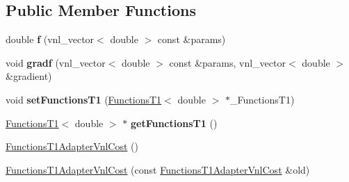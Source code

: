 \subsection*{Public Member Functions}
\begin{DoxyCompactItemize}
\item 
\hypertarget{class_ox_1_1_functions_t1_adapter_vnl_cost_ae74d956d16b010a32cfabda090674d4b}{double {\bfseries f} (vnl\-\_\-vector$<$ double $>$ const \&params)}\label{class_ox_1_1_functions_t1_adapter_vnl_cost_ae74d956d16b010a32cfabda090674d4b}

\item 
\hypertarget{class_ox_1_1_functions_t1_adapter_vnl_cost_a6a147aabdfb2c40916fe353044739484}{void {\bfseries gradf} (vnl\-\_\-vector$<$ double $>$ const \&params, vnl\-\_\-vector$<$ double $>$ \&gradient)}\label{class_ox_1_1_functions_t1_adapter_vnl_cost_a6a147aabdfb2c40916fe353044739484}

\item 
\hypertarget{class_ox_1_1_functions_t1_adapter_vnl_cost_a42a684f88c04d8b1bfafeb010a27a6fd}{void {\bfseries set\-Functions\-T1} (\hyperlink{class_ox_1_1_functions_t1}{Functions\-T1}$<$ double $>$ $\ast$\-\_\-\-Functions\-T1)}\label{class_ox_1_1_functions_t1_adapter_vnl_cost_a42a684f88c04d8b1bfafeb010a27a6fd}

\item 
\hypertarget{class_ox_1_1_functions_t1_adapter_vnl_cost_a8550e4df6a10d70787dbbdd92b319d97}{\hyperlink{class_ox_1_1_functions_t1}{Functions\-T1}$<$ double $>$ $\ast$ {\bfseries get\-Functions\-T1} ()}\label{class_ox_1_1_functions_t1_adapter_vnl_cost_a8550e4df6a10d70787dbbdd92b319d97}

\item 
\hyperlink{class_ox_1_1_functions_t1_adapter_vnl_cost_aa6ba3711ef14ce2e89332151cf5690d3}{Functions\-T1\-Adapter\-Vnl\-Cost} ()
\item 
\hyperlink{class_ox_1_1_functions_t1_adapter_vnl_cost_a6fe96f7359794ef4d1dc00cd6defa498}{Functions\-T1\-Adapter\-Vnl\-Cost} (const \hyperlink{class_ox_1_1_functions_t1_adapter_vnl_cost}{Functions\-T1\-Adapter\-Vnl\-Cost} \&old)
\end{DoxyCompactItemize}


